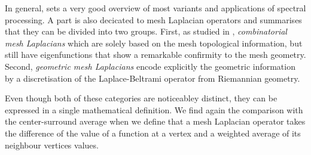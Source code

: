 In general, \cite{zhang_spectral_2010} sets a very good overview of most variants and applications of spectral processing.
A part is also decicated to mesh Laplacian operators and summarises that they can be divided into two groups.
First, as studied in \cite{chung_spectral_1997}, \textit{combinatorial mesh Laplacians} which are solely based on the mesh topological information, but still have eigenfunctions that show a remarkable confirmity to the mesh geometry.
Second, \textit{geometric mesh Laplacians} encode explicitly the geometric information by a discretisation of the Laplace-Beltrami operator from Riemannian geometry.

Even though both of these categories are noticeabley distinct, they can be expressed in a single mathematical definition.
We find again the comparison with the center-surround average when we define that a mesh Laplacian operator takes the difference of the value of a function at a vertex and a weighted average of its neighbour vertices values.

